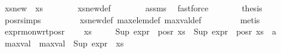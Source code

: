 \begin{isabellebody}
\ {\isachardoublequoteopen}xs{\isacharunderscore}{\kern0pt}new\ {\isacharequal}{\kern0pt}\ xs{\isachardoublequoteclose}\isanewline
\ \ \ \ \ \ \isamarkupfalse%
\ xs{\isacharunderscore}{\kern0pt}new{\isacharunderscore}{\kern0pt}def\isanewline
\ \ \ \ \ \ \isamarkupfalse%
\ assms\ \isamarkupfalse%
\ fastforce\isanewline
\ \ \ \ \isamarkupfalse%
\ \isamarkupfalse%
\ {\isacharquery}{\kern0pt}thesis\ \isamarkupfalse%
\ pos{\isacharunderscore}{\kern0pt}r{\isachardot}{\kern0pt}simps\ \isanewline
\ \ \ \ \ \ \isamarkupfalse%
\ xs{\isacharunderscore}{\kern0pt}new{\isacharunderscore}{\kern0pt}def\ max{\isacharunderscore}{\kern0pt}elem{\isacharunderscore}{\kern0pt}def\ max{\isacharunderscore}{\kern0pt}val{\isacharunderscore}{\kern0pt}def\ \isanewline
\ \ \ \ \ \ \isamarkupfalse%
\ metis\ \isanewline
\ \ \isamarkupfalse%
\isanewline
{}\isamarkupfalse%
%
\endisatagproof
{\isafoldproof}%
%
\isadelimproof
\isanewline
%
\endisadelimproof
\isanewline
{}\isamarkupfalse%
\ expr{\isacharunderscore}{\kern0pt}{}{\isacharunderscore}{\kern0pt}mon{\isacharunderscore}{\kern0pt}wrt{\isacharunderscore}{\kern0pt}pos{\isacharunderscore}{\kern0pt}r{\isacharcolon}{\kern0pt}\ \isanewline
\ \ \ {\isachardoublequoteopen}xs\ {\isasymnoteq}\ {\isacharbraceleft}{\kern0pt}{\isacharbraceright}{\kern0pt}{\isachardoublequoteclose}\isanewline
\ \ \ {\isachardoublequoteopen}Sup\ {\isacharparenleft}{\kern0pt}expr{\isacharunderscore}{\kern0pt}{}\ {\isacharbackquote}{\kern0pt}\ {\isacharparenleft}{\kern0pt}pos{\isacharunderscore}{\kern0pt}r\ xs{\isacharparenright}{\kern0pt}{\isacharparenright}{\kern0pt}\ {\isasymle}\ Sup\ {\isacharparenleft}{\kern0pt}expr{\isacharunderscore}{\kern0pt}{}\ {\isacharbackquote}{\kern0pt}\ {\isacharparenleft}{\kern0pt}pos{\isacharunderscore}{\kern0pt}r\ {\isacharparenleft}{\kern0pt}xs\ {\isasymunion}\ {\isacharbraceleft}{\kern0pt}a{\isacharbraceright}{\kern0pt}{\isacharparenright}{\kern0pt}{\isacharparenright}{\kern0pt}{\isacharparenright}{\kern0pt}{\isachardoublequoteclose}\isanewline
%
\isadelimproof
%
\endisadelimproof
%
\isatagproof
{}\isamarkupfalse%
{\isacharminus}{\kern0pt}\isanewline
\ \ \isamarkupfalse%
\ max{\isacharunderscore}{\kern0pt}val\ \ {\isachardoublequoteopen}max{\isacharunderscore}{\kern0pt}val\ {\isasymequiv}\ {\isacharparenleft}{\kern0pt}Sup\ {\isacharparenleft}{\kern0pt}expr{\isacharunderscore}{\kern0pt}{}\ {\isacharbackquote}{\kern0pt}\ xs{\isacharparenright}{\kern0pt}{\isacharparenright}{\kern0pt}{\isachardoublequoteclose}\isanewline

\end{isabellebody}
